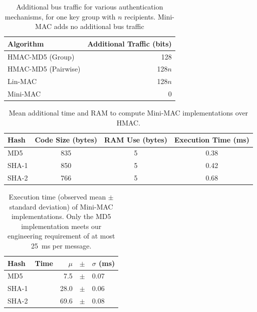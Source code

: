 	
	\begin{table}
	\centering
	\caption{Additional bus traffic for various authentication mechanisms, 
	for one key group with $n$ recipients.  Mini-MAC adds no additional bus traffic}
	\label{tab-traffic}
	\vspace{8pt}
	\begin{tabular}{l|r}%
	\bfseries Algorithm & \bfseries Additional Traffic (bits) \\\hline 
	HMAC-MD5 (Group) & 128 \\
	HMAC-MD5 (Pairwise) & 128$n$ \\
	Lin-MAC & 128$n$ \\
	Mini-MAC & 0 \\
	\end{tabular}
	\end{table}

	\begin{table}	
	\centering	
	\caption{Mean additional time and RAM to compute Mini-MAC implementations over HMAC.}
	\label{tab-overhead}
	\vspace{8pt}
	\begin{tabular}{l|c|c|c}%
	\bfseries Hash & \bfseries Code Size (bytes) & \bfseries RAM Use (bytes) & \bfseries Execution Time (ms)\\\hline 
	MD5 & 835 & 5 & 0.38 \\
	SHA-1 & 850 & 5 & 0.42 \\
	SHA-2 & 766 & 5 & 0.68 \\
	\end{tabular}
	\end{table}
	
	\begin{table}
	\centering
	\caption{Execution time (observed mean $\pm$ standard deviation) of Mini-MAC implementations.
	Only the MD5 implementation meets our engineering requirement of at most 25~ms per message.}
	\label{tab-time}
	\vspace{8pt}
	\begin{tabular}{ @{}l | lrcl}
	\hspace{2pt}\textbf{Hash} & {\textbf{Time}} & $\mu$ & $\pm$ & $\sigma$ (ms)  \\
		\hline 
		\hspace{2pt}MD5 	&& 7.5 		& $\pm$ 	& 0.07 \\
		\hspace{2pt}SHA-1 	&& 28.0 		& $\pm$		& 0.06 \\
		\hspace{2pt}SHA-2 	&& 69.6 		& $\pm$		& 0.08 \\ 
	\end{tabular}	
	\end{table}
	
